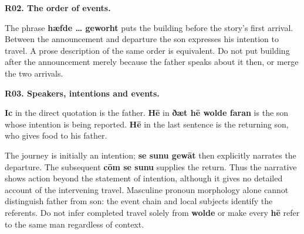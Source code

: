 \par\begin{minipage}{\linewidth}\raggedright
\textbf{R02. The order of events.}






The phrase \textbf{hæfde … geworht} puts the building before the story's first arrival. Between the announcement and departure the son expresses his intention to travel. A prose description of the same order is equivalent. Do not put building after the announcement merely because the father speaks about it then, or merge the two arrivals.

\end{minipage}\par\addvspace{4pt}

\par\begin{minipage}{\linewidth}\raggedright
\textbf{R03. Speakers, intentions and events.}

\textbf{Ic} in the direct quotation is the father. \textbf{Hē} in \textbf{ðæt hē wolde faran} is the son whose intention is being reported. \textbf{Hē} in the last sentence is the returning son, who gives food to his father.

The journey is initially an intention; \textbf{se sunu gewāt} then explicitly narrates the departure. The subsequent \textbf{cōm se sunu} supplies the return. Thus the narrative shows action beyond the statement of intention, although it gives no detailed account of the intervening travel. Masculine pronoun morphology alone cannot distinguish father from son: the event chain and local subjects identify the referents. Do not infer completed travel solely from \textbf{wolde} or make every \textbf{hē} refer to the same man regardless of context.

\end{minipage}\par\addvspace{4pt}

